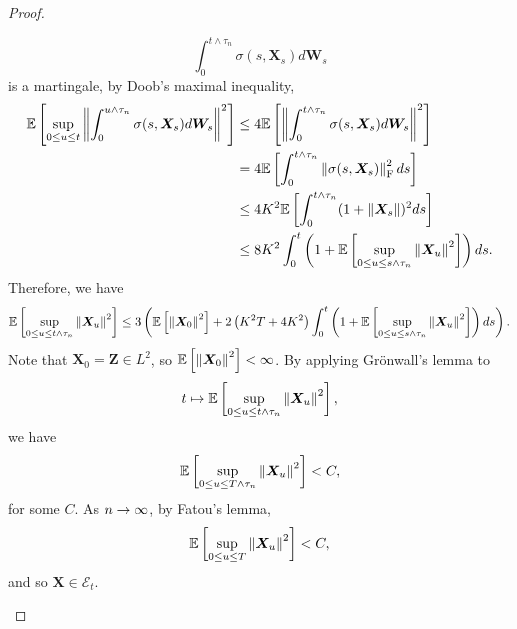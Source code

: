 \begin{proof}
\begin{itemize}
\begin{equation*}
            \int_0^{t \wedge \tau_n} \sigma(s,\bm{X}_s)d\bm{W}_s
        \end{equation*}
        is a martingale, by Doob's maximal inequality,
        \begin{align*}
            \mathbb{E}\left[\sup_{0\leq u \leq t}\left\lVert\int_0^{u  \wedge \tau_n} \sigma(s,\bm{X}_s)d\bm{W}_s\right\lVert^2\right] &\leq 4\mathbb{E}\left[\left\lVert\int_0^{t  \wedge \tau_n} \sigma(s,\bm{X}_s)d\bm{W}_s\right\lVert^2\right] \\
            &= 4 \mathbb{E}\left[\int_0^{t  \wedge \tau_n} \left\lVert\sigma(s,\bm{X}_s)\right\lVert_{\operatorname{F}}^2 ds\right] \\
            &\leq 4K^2 \mathbb{E}\left[\int_0^{t  \wedge \tau_n} (1 + \left\lVert\bm{X}_s\right\lVert)^2 ds\right]\\
            &\leq 8K^2 \int_0^{t} \left(1 + \mathbb{E}\left[\sup_{0\leq u \leq s \wedge \tau_n}\left\lVert\bm{X}_{u}\right\lVert^2\right]\right)ds.
        \end{align*}
        Therefore, we have
        \begin{equation*}
            \mathbb{E}\left[\sup_{0\leq u \leq t \wedge \tau_n}\left\lVert\bm{X}_{u}\right\lVert^2\right] \leq 3\left(
                \mathbb{E}\left[\left\lVert\bm{X}_0\right\lVert^2\right]+ 2\left(K^2 T+4 K^2\right)\int_0^{t} \left(1 + \mathbb{E}\left[\sup_{0\leq u \leq s \wedge \tau_n}\left\lVert\bm{X}_{u}\right\lVert^2\right]\right)ds
            \right).
        \end{equation*}
        Note that $\bm{X}_0 = \bm{Z} \in L^2$, so $\mathbb{E}\left[\left\lVert\bm{X}_0\right\lVert^2\right] < \infty$. By applying Gr\"onwall's lemma to
        \begin{equation*}
            t \mapsto \mathbb{E}\left[\sup_{0\leq u \leq t \wedge \tau_n}\left\lVert\bm{X}_{u}\right\lVert^2\right],
        \end{equation*}
        we have
        \begin{equation*}
            \mathbb{E}\left[\sup_{0\leq u \leq T \wedge \tau_n}\left\lVert\bm{X}_{u}\right\lVert^2\right] < C,
        \end{equation*}
        for some $C$. As $n \rightarrow \infty$, by Fatou's lemma,
        \begin{equation*}
            \mathbb{E}\left[\sup_{0\leq u \leq T}\left\lVert\bm{X}_{u}\right\lVert^2\right] < C,
        \end{equation*}
        and so $\bm{X} \in \mathcal{E}_t$.


\end{itemize}
\end{proof}

